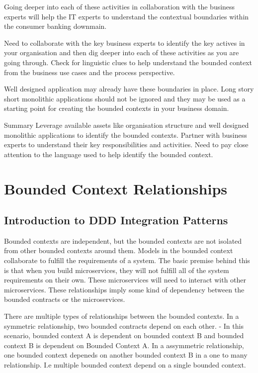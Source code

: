 Going deeper into each of these activities in collaboration with the business experts will help the IT experts to understand the contextual boundaries within the consumer banking downmain.

Need to collaborate with the key business experts to identify the key actives in your organisation and then dig deeper into each of these activities as you are going through.
Check for linguistic clues to help understand the bounded context from the business use cases and the process perspective.

Well designed application may already have these boundaries in place.
Long story short monolithic applications should not be ignored and they may be used as a starting point for creating the bounded contexts in your business domain.

Summary
Leverage available assets like organisation structure and well designed monolithic applications to identify the bounded contexts.
Partner with business experts to understand their key responsibilities and activities.
Need to pay close attention to the language used to help identify the bounded context.

\chapter{Bounded Context Relationships}

\section{Introduction to DDD Integration Patterns}
Bounded contexts are independent, but the bounded contexts are not isolated from other bounded contexts around them.
Models in the bounded context collaborate to fulfill the requirements of a system.
The basic premise behind this is that when you build microservices, they will not fulfill all of the system requirements on their own.
These microservices will need to interact with other microservices.
These relationships imply some kind of dependency between the bounded contracts or the microservices.

There are multiple types of relationships between the bounded contexts.
In a symmetric relationship, two bounded contracts depend on each other.
- In this scenario, bounded context A is dependent on bounded context B and bounded context B is dependent on Bounded Context A.
In a assymmetric relationship, one bounded context depeneds on another bounded context B in a one to many relationship. I.e multiple bounded context depend on a single bounded context.

